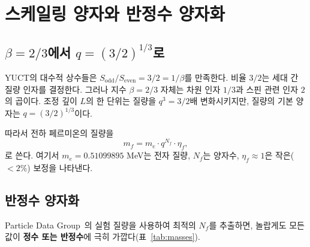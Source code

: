 \documentclass[12pt,a4paper]{article}
\begin{document}
	\section{스케일링 양자와 반정수 양자화}
	
	\subsection{\(\beta = 2/3\)에서 \(q = (3/2)^{1/3}\)로}
	
	YUCT의 대수적 상수들은 \(S_{\mathrm{odd}}/S_{\mathrm{even}} = 3/2 = 1/\beta\)를 만족한다. 비율 \(3/2\)는 세대 간 질량 인자를 결정한다. 그러나 지수 \(\beta = 2/3\) 자체는 차원 인자 \(1/3\)과 스핀 관련 인자 \(2\)의 곱이다. 조정 깊이 \(L\)의 한 단위는 질량을 \(q^3 = 3/2\)배 변화시키지만, 질량의 기본 양자는 \(q = (3/2)^{1/3}\)이다.
	
	따라서 전하 페르미온의 질량을
	\begin{equation}
		m_f = m_e \cdot q^{N_f} \cdot \eta_f,
		\label{eq:quantized}
	\end{equation}
	로 쓴다. 여기서 \(m_e = 0.51099895\) MeV는 전자 질량, \(N_f\)는 양자수, \(\eta_f \approx 1\)은 작은(\(<2\%\)) 보정을 나타낸다.
	
	\subsection{반정수 양자화}
	
	Particle Data Group~\cite{PDG2024}의 실험 질량을 사용하여 최적의 \(N_f\)를 추출하면, 놀랍게도 모든 값이 \textbf{정수 또는 반정수}에 극히 가깝다(표~\ref{tab:masses}).
	
\end{document}
